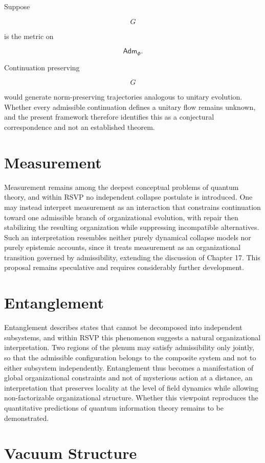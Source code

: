 \documentclass[11pt,oneside]{book}
\numberwithin{equation}{chapter}
\theoremstyle{definition}
\theoremstyle{plain}
\newcommand{\Adm}{\mathsf{Adm}}
\begin{document}
Suppose

\[
G
\]

is the metric on

\[
\Adm_\Phi.
\]

Continuation preserving

\[
G
\]

would generate norm-preserving trajectories analogous to unitary evolution. Whether every admissible continuation defines a unitary flow remains unknown, and the present framework therefore identifies this as a conjectural correspondence and not an established theorem.

\section{Measurement}

Measurement remains among the deepest conceptual problems of quantum theory, and within RSVP no independent collapse postulate is introduced. One may instead interpret measurement as an interaction that constrains continuation toward one admissible branch of organizational evolution, with repair then stabilizing the resulting organization while suppressing incompatible alternatives. Such an interpretation resembles neither purely dynamical collapse models nor purely epistemic accounts, since it treats measurement as an organizational transition governed by admissibility, extending the discussion of Chapter 17. This proposal remains speculative and requires considerably further development.

\section{Entanglement}

Entanglement describes states that cannot be decomposed into independent subsystems, and within RSVP this phenomenon suggests a natural organizational interpretation. Two regions of the plenum may satisfy admissibility only jointly, so that the admissible configuration belongs to the composite system and not to either subsystem independently. Entanglement thus becomes a manifestation of global organizational constraints and not of mysterious action at a distance, an interpretation that preserves locality at the level of field dynamics while allowing non-factorizable organizational structure. Whether this viewpoint reproduces the quantitative predictions of quantum information theory remains to be demonstrated.

\section{Vacuum Structure}
\end{document}

